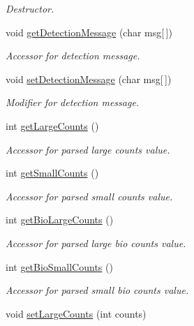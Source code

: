 \begin{DoxyCompactItemize}
\begin{DoxyCompactList}\small\item\em Destructor. \end{DoxyCompactList}\item 
void \hyperlink{class_particle_detection_belief_a55c8bf69923ac0c45b606efba40c6d9c}{getDetectionMessage} (char msg\mbox{[}$\,$\mbox{]})
\begin{DoxyCompactList}\small\item\em Accessor for detection message. \end{DoxyCompactList}\item 
void \hyperlink{class_particle_detection_belief_abbfb68557c50bf5d81380de02419d9ef}{setDetectionMessage} (char msg\mbox{[}$\,$\mbox{]})
\begin{DoxyCompactList}\small\item\em Modifier for detection message. \end{DoxyCompactList}\item 
int \hyperlink{class_particle_detection_belief_ac72de10bee646aeacad6dcacab4f13f1}{getLargeCounts} ()
\begin{DoxyCompactList}\small\item\em Accessor for parsed large counts value. \end{DoxyCompactList}\item 
int \hyperlink{class_particle_detection_belief_a9aa9b38cfd12ededaf6927722a6202d3}{getSmallCounts} ()
\begin{DoxyCompactList}\small\item\em Accessor for parsed small counts value. \end{DoxyCompactList}\item 
int \hyperlink{class_particle_detection_belief_a462db9afd1c1c26fa75e39e00452c50d}{getBioLargeCounts} ()
\begin{DoxyCompactList}\small\item\em Accessor for parsed large bio counts value. \end{DoxyCompactList}\item 
int \hyperlink{class_particle_detection_belief_a8d535f5660148475fbb243a45f69b249}{getBioSmallCounts} ()
\begin{DoxyCompactList}\small\item\em Accessor for parsed small bio counts value. \end{DoxyCompactList}\item 
void \hyperlink{class_particle_detection_belief_ab0acda2a565abd8650e23cdb71d21efb}{setLargeCounts} (int counts)

\end{DoxyCompactItemize}
